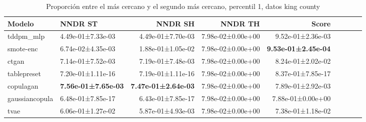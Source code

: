\begin{table}[H]
\centering
\fontsize{10}{14}\selectfont
\caption{Proporción entre el más cercano y el segundo más cercano, percentil 1, datos king county}
\label{table-dcr-king county-a}
\begin{tabular}{|l|l|r|r|r|r|r|r|r|}
\hline
\rowcolor[gray]{0.8}
Modelo & NNDR ST & NNDR SH & NNDR TH & \textbf{Score} \\
\hline tddpm\_mlp & 4.49e-01±7.33e-03 & 4.49e-01±7.70e-03 & 7.98e-02±0.00e+00 & 9.52e-01±2.36e-03 \\
\hline smote-enc & \cellcolor[rgb]{0.9, 0.54, 0.52} 6.74e-02±4.35e-03 & \cellcolor[rgb]{0.9, 0.54, 0.52} 1.88e-01±1.05e-02 & 7.98e-02±0.00e+00 & \bfseries 9.53e-01±2.45e-04 \\
\hline ctgan & 7.14e-01±7.52e-03 & 7.19e-01±7.48e-03 & 7.98e-02±0.00e+00 & 8.24e-01±2.02e-02 \\
\hline tablepreset & 7.20e-01±1.11e-16 & 7.19e-01±1.11e-16 & 7.98e-02±0.00e+00 & 8.37e-01±7.85e-17 \\
\hline copulagan & \bfseries 7.56e-01±7.65e-03 & \bfseries 7.47e-01±2.64e-03 & 7.98e-02±0.00e+00 & 7.89e-01±2.92e-03 \\
\hline gaussiancopula & 6.48e-01±7.85e-17 & 6.43e-01±7.85e-17 & 7.98e-02±0.00e+00 & 7.88e-01±0.00e+00 \\
\hline tvae & 6.06e-01±1.27e-02 & 5.87e-01±4.93e-03 & 7.98e-02±0.00e+00 & \cellcolor[rgb]{0.9, 0.54, 0.52} 7.38e-01±1.18e-02 \\
\hline
\end{tabular}
\end{table}
